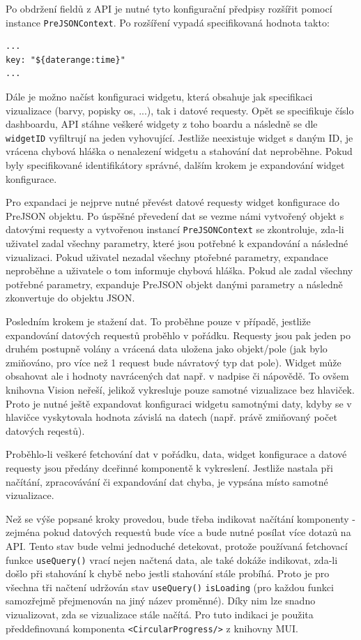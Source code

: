 \documentclass[czech, bc, kiv, he, iso690numb]{fasthesis}
\begin{document}
Po obdržení fieldů z API je nutné tyto konfigurační předpisy rozšířit pomocí instance \texttt{PreJSONContext}. Po rozšíření vypadá specifikovaná hodnota takto:
\lstset{style=plainsrc}
\begin{lstlisting}
...
key: "${daterange:time}"
...
\end{lstlisting}

Dále je možno načíst konfiguraci widgetu, která obsahuje jak specifikaci vizualizace (barvy, popisky os, ...), tak i datové requesty. Opět se specifikuje číslo dashboardu, API stáhne veškeré widgety z toho boardu a následně se dle \texttt{widgetID} vyfiltrují na jeden vyhovující. Jestliže
neexistuje widget s daným ID, je vrácena chybová hláška o nenalezení widgetu a stahování dat neproběhne. Pokud byly specifikované identifikátory správné, dalším krokem je expandování
widget konfigurace. 

Pro expandaci je nejprve nutné převést datové requesty widget konfigurace do PreJSON objektu. Po úspěšné převedení dat se vezme námi vytvořený objekt s datovými requesty a vytvořenou instancí \texttt{PreJSONContext} se zkontroluje, zda-li uživatel zadal všechny parametry, které jsou
potřebné k expandování a následné vizualizaci. Pokud uživatel nezadal všechny ptořebné parametry, expandace neproběhne a uživatele o tom informuje chybová hláška. Pokud ale zadal 
všechny potřebné parametry, expanduje PreJSON objekt danými parametry a následně zkonvertuje do objektu JSON.

Posledním krokem je stažení dat. To proběhne pouze v případě, jestliže expandování datových requestů proběhlo v pořádku. Requesty jsou pak jeden po druhém postupně volány a vrácená data
uložena jako objekt/pole (jak bylo zmiňováno, pro více než 1 request bude návratový typ dat pole). Widget může obsahovat ale i hodnoty navrácených dat např. v nadpise či nápovědě.
To ovšem knihovna Vision neřeší, jelikož vykresluje pouze samotné vizualizace bez hlaviček. Proto je nutné ještě expandovat konfiguraci widgetu samotnými daty, kdyby se v hlavičce vyskytovala
hodnota závislá na datech (např. právě zmiňovaný počet datových reqestů). 

Proběhlo-li veškeré fetchování dat v pořádku, data, widget konfigurace a datové requesty jsou předány dceřinné komponentě k vykreslení. Jestliže nastala při načítání, zpracovávání či expandování dat
chyba, je vypsána místo samotné vizualizace. 

Než se výše popsané kroky provedou, bude třeba indikovat načítání komponenty - zejména pokud datových requestů bude více a bude nutné posílat více dotazů na API. Tento stav bude velmi jednoduché 
detekovat, protože používaná fetchovací funkce \texttt{useQuery()} vrací nejen načtená data, ale také dokáže indikovat, zda-li došlo při stahování k chybě nebo jestli stahování stále probíhá. Proto
je pro všechna tři načtení udržován stav \texttt{useQuery()} \texttt{isLoading} (pro každou funkci samozřejmě přejmenován na jiný název proměnné). Díky nim lze snadno vizualizovat, zda se vizualizace stále načítá.
Pro tuto indikaci je použita předdefinovaná komponenta \texttt{<CircularProgress/>} z knihovny MUI.
\end{document}
